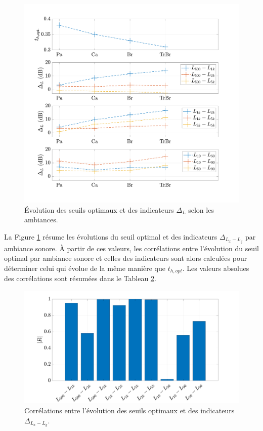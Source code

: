 \begin{figure}[h]
\centering
\includegraphics[width=0.9\linewidth]{./figures/resultats/deltaL_opt.pdf}
\caption{Évolution des seuils optimaux et des indicateurs $\Delta_L$ selon les ambiances.}
\label{fig:delta_L}
\end{figure}


La Figure \ref{fig:delta_L} résume les évolutions du seuil optimal et des indicateurs $\Delta_{L_x-L_y}$ par ambiance sonore. \`A partir de ces valeurs, les corrélations entre l'évolution du seuil optimal par ambiance sonore et celles des indicateurs sont alors calculées pour déterminer celui qui évolue de la même manière que $t_{h,opt}$. Les valeurs absolues des corrélations sont résumées dans le Tableau \ref{fig:correlation}.

\begin{figure}[h]
\centering
\includegraphics[width=0.9\linewidth]{./figures/resultats/Opt_correlation.pdf}
\caption{Corrélations entre l'évolution des seuils optimaux et des indicateurs $\Delta_{L_x-L_y}$.}
\label{fig:correlation}
\end{figure}

